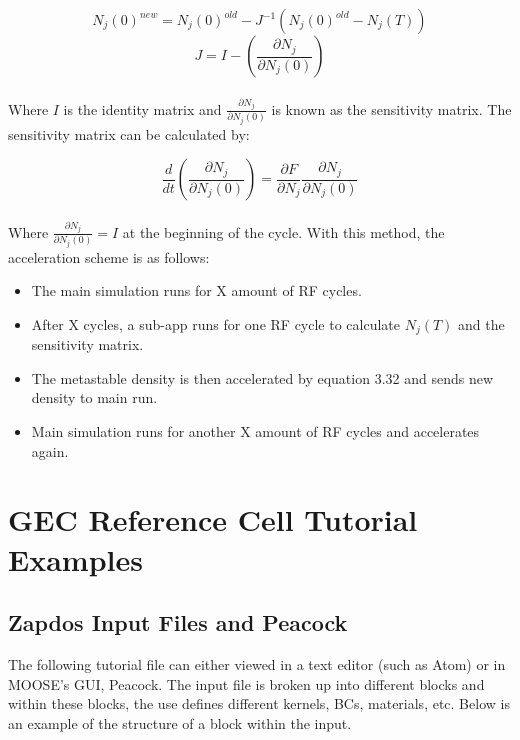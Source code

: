 \documentclass[final]{report}
\begin{document}
  \begin{equation}
     N_{j}(0)^{new}=N_{j}(0)^{old}-J^{-1}(N_{j}(0)^{old}-N_{j}(T))
  \end{equation}
  \begin{equation}
     J=I-\left( \frac{\partial N_{j}}{\partial N_{j}(0)} \right)
  \end{equation}
  \\
  Where $I$ is the identity matrix and $\frac{\partial N_{j}}{\partial N_{j}(0)}$ is known as the sensitivity matrix. The sensitivity matrix can be calculated by:

   \begin{equation}
     \frac{d}{dt}\left( \frac{\partial N_{j}}{\partial N_{j}(0)} \right) = \frac{\partial F}{\partial N_{j}} \frac{\partial N_{j}}{\partial N_{j}(0)}
  \end{equation}
  \\
  Where $\frac{\partial N_{j}}{\partial N_{j}(0)} = I$ at the beginning of the cycle. With this method, the acceleration scheme is as follows:

  \begin{itemize}
      \item The main simulation runs for X amount of RF cycles.
      \item After X cycles, a sub-app runs for one RF cycle to calculate $N_{j}(T)$ and the sensitivity matrix.
      \item The metastable density is then accelerated by equation 3.32 and sends new density to main run.
      \item Main simulation runs for another X amount of RF cycles and accelerates again.
  \end{itemize}

  \chapter{GEC Reference Cell Tutorial Examples} \label{chapter4}

  \section{Zapdos Input Files and Peacock}

  The following tutorial file can either viewed in a text editor (such as Atom) or in MOOSE's GUI, Peacock. The input file is broken up into different blocks and within these blocks, the use defines different kernels, BCs, materials, etc. Below is an example of the structure of a block within the input.
\end{document}
